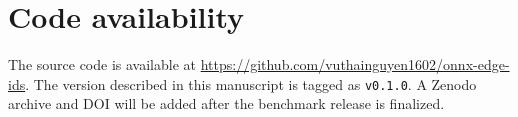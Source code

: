 \section*{Code availability}

The source code is available at \url{https://github.com/vuthainguyen1602/onnx-edge-ids}. The version described in this manuscript is tagged as \texttt{v0.1.0}. A Zenodo archive and DOI will be added after the benchmark release is finalized.
